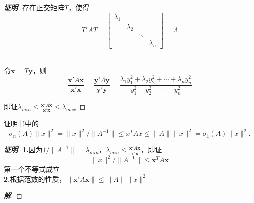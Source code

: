 \documentclass[12pt, a4paper, oneside]{ctexbook}
\newcommand\zm[2]{\begin{proof}[\textbf{#1}]
    #2
\end{proof}}
\newcommand\jie[2]{\begin{proof}[\textbf{#1}]
    #2
\end{proof}}
\newcommand\bv[1]{\boldsymbol{#1}}
\begin{document}
\zm{证明}{存在正交矩阵$T$，使得
    \begin{equation*}
        T'AT = \begin{bmatrix}
            \lambda_{1} &             &        &             \\
                        & \lambda_{2} &        &             \\
                        &             & \ddots &             \\
                        &             &        & \lambda_{n}
        \end{bmatrix}=\Lambda
    \end{equation*}\\
    \par 令$\bv{x} = T\bv{y}$，则
    \begin{equation*}
        \frac{\bv{x}'A\bv{x}}{\bv{x'x}} =\frac{\bv{y}'\Lambda\bv{y}}{\bv{y'y}}
        = \frac{\lambda_{1}y_{1}^2+\lambda_{2}y_{2}^2+\cdots +\lambda_{n}y_{n}^2}{y_{1}^2+y_{2}^2+\cdots +y_{n}^2}
    \end{equation*}
    \par 即证$
        \lambda_{min} \leq \frac{\bv{x}'A\bv{x}}{\bv{x'x}} \leq \lambda_{max}
    $
}
\par 证明书中的\begin{equation}
    \sigma_n(A)\|x\|^2=\|x\|^2/\|A^{-1}\|\leq x^TAx\leq\|A\|\|x\|^2=\sigma_1(A)\|x\|^2.
\end{equation}
\zm{证明}{\textbf{1.}\;因为$1/\|A^{-1}\|=\lambda_{min}$，$\lambda_{min} \leq \frac{\bv{x}'A\bv{x}}{\bv{x'x}}$，即证\begin{equation*}
    \|x\|^2/\|A^{-1}\|\leq \bv{x}^TA\bv{x}
\end{equation*}
第一个不等式成立\\
\textbf{2.}\;根据范数的性质，$\|\bv{x}'A\bv{x}\|\leq \|A\|\|x\|^2$
}

\jie{解}{}
\end{document}
